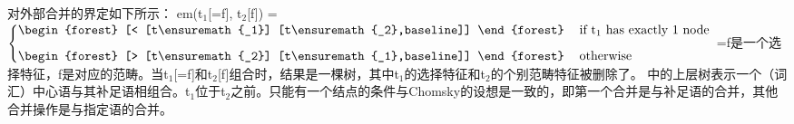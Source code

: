  \citet[]{Stabler2010a}对外部合并的界定如下所示：
\ea
\label{Definition-EM}
em(t$_1$[=f], t$_2$[f]) = $\left\{ \begin{tabular}{@{}ll@{}}
                                   \begin{forest}
                                   [<
                                     [t\ensuremath{_1}]
                                     [t\ensuremath{_2},baseline]]
                                   \end{forest} & if t\ensuremath{_1} has exactly 1 node\\[2ex]
                                   \begin{forest}
                                   [>
                                     [t\ensuremath{_2}]
                                     [t\ensuremath{_1},baseline]]
                                   \end{forest} & otherwise\\
                                   \end{tabular}
\right.$
\z
=f是一个选择特征，f是对应的范畴。当t$_1$[=f]和t$_2$[f]组合时，结果是一棵树，其中t$_1$的选择特征和t$_2$的个别范畴特征被删除了。 中的上层树表示一个（词汇）中心语与其补足语相组合。t$_1$位于t$_2$之前。只能有一个结点的条件与Chomsky的设想是一致的，即第一个合并是与补足语的合并，其他合并操作是与指定语的合并\citep[]{Chomsky2008a}。

